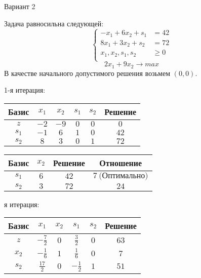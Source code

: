 \documentclass{article}%
\begin{document}
\newpage%
\begin{center}%
\begin{Huge}%
Вариант 2%
\end{Huge}%
\end{center}%
Задача равносильна следующей: %
\[%
\left\{\begin{aligned}-x_{1}+6x_{2}+s_{1} & =42 \\8x_{1}+3x_{2}+s_{2} & =72 \\x_{1},x_{2},s_{1},s_{2} & \ge 0 \\ \end{aligned}\right.%
\]%
\[%
2x_{1}+9x_{2}  \to max%
\]%
В качестве начального допустимого решения возьмем %
$(0, 0).$%
\begin{flushleft}%
1{-}я итерация: %
\newline%
\newline%
\renewcommand{\arraystretch}{1.3}%
\begin{tabular}{|c|cccc|c|}%
\hline%
Базис&$x_{1}$&$x_{2}$&$s_{1}$&$s_{2}$&Решение\\%
\hline%
$z$&$-2$&$-9$&$0$&$0$&$0$\\%
\hline%
$s_{1}$&$-1$&$6$&$1$&$0$&$42$\\%
$s_{2}$&$8$&$3$&$0$&$1$&$72$\\%
\hline%
\end{tabular}%
\newline%
\newline%
\newline%
\begin{tabular}{|cccc|}%
\hline%
Базис&$x_{2}$&Решение&Отношение\\%
\hline%
$s_{1}$&$6$&$42$&$7\: \text{(Оптимально)}$\\%
$s_{2}$&$3$&$72$&$24$\\%
\hline%
\end{tabular}%
\newline%
\newline%
я итерация: %
\newline%
\newline%
\renewcommand{\arraystretch}{1.3}%
\begin{tabular}{|c|cccc|c|}%
\hline%
Базис&$x_{1}$&$x_{2}$&$s_{1}$&$s_{2}$&Решение\\%
\hline%
$z$&$-\frac{7}{2}$&$0$&$\frac{3}{2}$&$0$&$63$\\%
\hline%
$x_{2}$&$-\frac{1}{6}$&$1$&$\frac{1}{6}$&$0$&$7$\\%
$s_{2}$&$\frac{17}{2}$&$0$&$-\frac{1}{2}$&$1$&$51$\\%

\end{tabular}
\end{flushleft}
\end{document}
